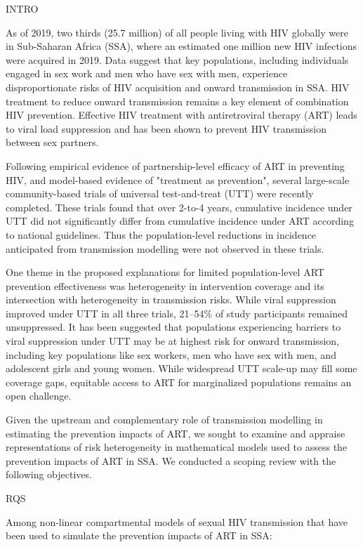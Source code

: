 

INTRO

As of 2019, two thirds (25.7 million) of all people living with HIV globally
were in Sub-Saharan Africa (SSA), where
an estimated one million new HIV infections were acquired in 2019.
Data suggest that key populations, including individuals engaged in sex work and men who have sex with men,
experience disproportionate risks of HIV acquisition and onward transmission in SSA.
HIV treatment to reduce onward transmission remains a key element of combination HIV prevention.
Effective HIV treatment with antiretroviral therapy (ART) leads to viral load suppression
and has been shown to prevent HIV transmission between sex partners.

Following empirical evidence of partnership-level efficacy of ART
in preventing HIV,
and model-based evidence of "treatment as prevention",
several large-scale community-based trials of universal test-and-treat (UTT)
were recently completed.
These trials found that over 2-to-4 years,
cumulative incidence under UTT did not significantly differ from
cumulative incidence under ART according to national guidelines.
Thus the population-level reductions in incidence anticipated from transmission modelling
were not observed in these trials.

One theme in the proposed explanations for limited population-level ART prevention effectiveness
was heterogeneity in intervention coverage and its intersection with
heterogeneity in transmission risks.
While viral suppression improved under UTT in all three trials,
21--54\% of study participants remained unsuppressed.
It has been suggested that populations experiencing barriers to viral suppression under UTT
may be at highest risk for onward transmission, including key populations like
sex workers, men who have sex with men, and adolescent girls and young women.
While widespread UTT scale-up may fill some coverage gaps,
equitable access to ART for marginalized populations remains an open challenge.

Given the upstream and complementary role of transmission modelling
in estimating the prevention impacts of ART,
we sought to examine and appraise representations of risk heterogeneity
in mathematical models used to assess the prevention impacts of ART in SSA.
We conducted a scoping review with the following objectives.

RQS

Among non-linear compartmental models of sexual HIV transmission
that have been used to simulate the prevention impacts of ART in SSA:

